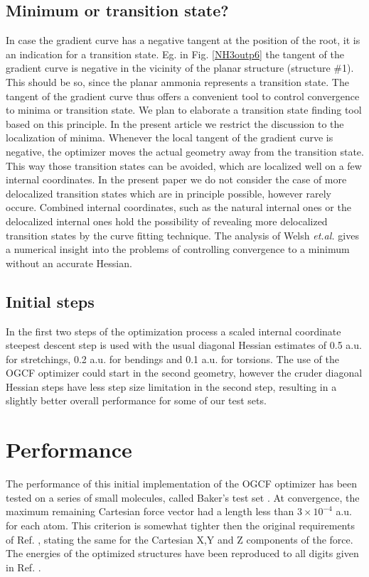 \documentclass[prl,aps,twocolumn,showpacs,twocolumngrid,superbib]{revtex4}
\begin{document}
\subsection{Minimum or transition state?}
In case the gradient curve has a negative tangent at the position
of the root, it is an indication for a transition state. 
Eg. in Fig. \ref{NH3outp6} the tangent of the gradient curve 
is negative in the vicinity of the planar
structure (structure \#1). This should be so, since the planar
ammonia represents a transition state. The tangent of the gradient 
curve thus offers a
convenient tool to control convergence to minima or transition state.
We plan to elaborate a transition state finding tool based on this 
principle. In the present article we restrict the discussion
to the localization of minima. Whenever the local tangent  
of the gradient curve
is negative, the optimizer moves the actual geometry away from 
the transition state. This way those transition states 
can be avoided, which are localized well on a few internal coordinates. 
In the present paper we do not consider the case of more 
delocalized transition states which are in principle possible,
however rarely occure. Combined internal coordinates, such
as the natural internal ones \cite{Pulay_natural_internals} or the
delocalized internal ones \cite{Baker_deloc_1} hold the possibility
of revealing more delocalized transition states by the
curve fitting technique. The analysis of Welsh {\it et.al.} 
gives a numerical insight into the problems of controlling
convergence to a minimum without an accurate Hessian.

\subsection{Initial steps}
In the first two steps of the optimization
process a scaled internal coordinate steepest descent step is used
with the usual diagonal Hessian estimates of
0.5 a.u. for stretchings, 0.2 a.u. for bendings and 0.1 a.u.
for torsions. The use of the OGCF optimizer could start in the
second geometry, however the cruder diagonal Hessian steps have less
step size limitation in the second step, resulting in a slightly
better overall performance for some of our test sets.

\section{Performance}
The performance of this initial implementation of the OGCF optimizer
has been tested on a 
series of small molecules, called Baker's test set \cite{bakerstest}.
At convergence, the maximum remaining Cartesian
force vector had a length less than $3\times10^{-4}$ a.u. for each
atom. This criterion is somewhat tighter then the original requirements
of Ref. \cite{bakerstest}, stating the same for the Cartesian X,Y and Z
components of the force. The energies of the optimized
structures have been reproduced to all digits given in 
Ref. \cite{bakerstest}.
\end{document}
